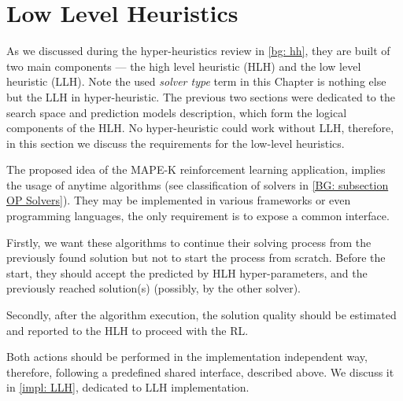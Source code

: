 \section{Low Level Heuristics}\label{concept: llh}
As we discussed during the hyper-heuristics review in \cref{bg: hh}, they are built of two main components — the high level heuristic (HLH) and the low level heuristic (LLH). Note the used \emph{solver type} term in this Chapter is nothing else but the LLH in hyper-heuristic. The previous two sections were dedicated to the search space and prediction models description, which form the logical components of the HLH. No hyper-heuristic could work without LLH, therefore, in this section we discuss the requirements for the low-level heuristics.

The proposed idea of the MAPE-K reinforcement learning application, implies the usage of anytime algorithms (see classification of solvers in \cref{BG: subsection OP Solvers}).
They may be implemented in various frameworks or even programming languages, the only requirement is to expose a common interface. 

Firstly, we want these algorithms to continue their solving process from the previously found solution but not to start the process from scratch. Before the start, they should accept the predicted by HLH hyper-parameters, and the previously reached solution(s) (possibly, by the other solver). 

Secondly, after the algorithm execution, the solution quality should be estimated and reported to the HLH to proceed with the RL.

Both actions should be performed in the implementation independent way, therefore, following a predefined shared interface, described above. We discuss it in \cref{impl: LLH}, dedicated to LLH implementation.


